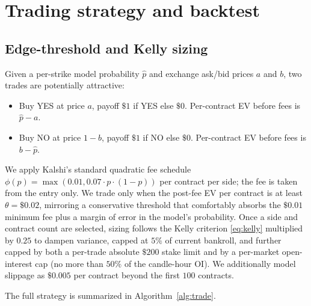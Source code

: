 \documentclass[11pt]{article}
\begin{document}
\section{Trading strategy and backtest}
\label{sec:trading}

\subsection{Edge-threshold and Kelly sizing}

Given a per-strike model probability $\hat{p}$ and exchange ask/bid prices
$a$ and $b$, two trades are potentially attractive:

\begin{itemize}[leftmargin=*,topsep=2pt,itemsep=2pt]
\item Buy YES at price $a$, payoff $\$1$ if YES else $\$0$. Per-contract EV
before fees is $\hat{p} - a$.
\item Buy NO at price $1 - b$, payoff $\$1$ if NO else $\$0$. Per-contract EV
before fees is $b - \hat{p}$.
\end{itemize}

We apply Kalshi's standard quadratic fee schedule
$\phi(p) = \max(0.01, 0.07 \cdot p \cdot (1-p))$ per contract per side; the
fee is taken from the entry only. We trade only when the post-fee EV per
contract is at least $\theta = \$0.02$, mirroring a conservative
threshold that comfortably absorbs the $\$0.01$ minimum fee plus a margin
of error in the model's probability. Once a side and contract count are
selected, sizing follows the Kelly criterion \eqref{eq:kelly} multiplied
by $0.25$ to dampen variance, capped at $5\%$ of current bankroll, and further
capped by both a per-trade absolute $\$200$ stake limit and by a
per-market open-interest cap (no more than $50\%$ of the candle-hour OI).
We additionally model slippage as $\$0.005$ per contract beyond the
first $100$ contracts.

The full strategy is summarized in Algorithm~\ref{alg:trade}.
\end{document}

